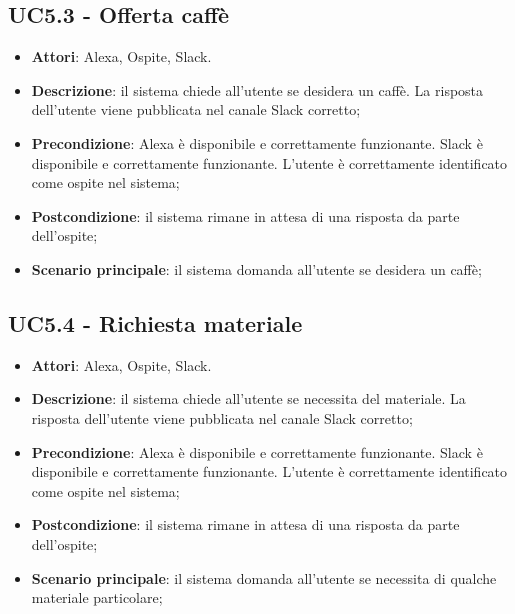 \documentclass[../AnalisiDeiRequisiti_v3.0.0.tex]{subfiles}
\begin{document}
\subsection{UC5.3 - Offerta caffè} 
\label{sssec:UC5.3} 
\begin{itemize} 
\item \textbf{Attori}: Alexa, Ospite, Slack.
\item \textbf{Descrizione}: il sistema chiede all'utente se desidera un caffè. La risposta dell'utente viene pubblicata nel canale Slack corretto;
\item \textbf{Precondizione}: Alexa è disponibile e correttamente funzionante. Slack è disponibile e correttamente funzionante. L'utente è correttamente identificato come ospite nel sistema;
\item \textbf{Postcondizione}: il sistema rimane in attesa di una risposta da parte dell'ospite;
\item \textbf{Scenario principale}: il sistema domanda all'utente se desidera un caffè;
\end{itemize} 
\subsection{UC5.4 - Richiesta materiale} 
\label{sssec:UC5.4} 
\begin{itemize} 
\item \textbf{Attori}: Alexa, Ospite, Slack.
\item \textbf{Descrizione}: il sistema chiede all'utente se necessita del materiale. La risposta dell'utente viene pubblicata nel canale Slack corretto;
\item \textbf{Precondizione}: Alexa è disponibile e correttamente funzionante. Slack è disponibile e correttamente funzionante. L'utente è correttamente identificato come ospite nel sistema;
\item \textbf{Postcondizione}: il sistema rimane in attesa di una risposta da parte dell'ospite;
\item \textbf{Scenario principale}: il sistema domanda all'utente se necessita di qualche materiale particolare;
\end{itemize} 
\end{document}
